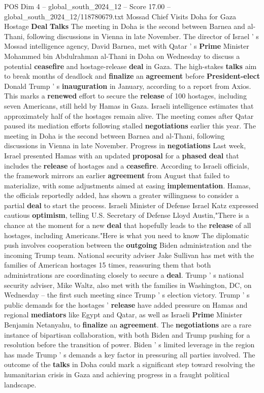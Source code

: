 \begin{textsample}{POS Dim 4 – global\_south\_2024\_12 – Score 17.00 – global\_south\_2024\_12/118780679.txt}  \label{ex:f4_pos_259}
Mossad Chief Visits Doha for Gaza Hostage \textbf{Deal} \textbf{Talks} The meeting in Doha is the second between Barnea and al-Thani, following discussions in Vienna in late November.
The director of Israel ' s Mossad intelligence agency, David Barnea, met with Qatar ' s \textbf{Prime} Minister Mohammed bin Abdulrahman al-Thani in Doha on Wednesday to discuss a potential \textbf{ceasefire} and hostage-release \textbf{deal} in Gaza.
The high-stakes \textbf{talks} aim to break months of deadlock and \textbf{finalize} an \textbf{agreement} before \textbf{President-elect} Donald Trump ' s \textbf{inauguration} in January, according to a report from Axios.
This marks a \textbf{renewed} effort to secure the \textbf{release} of 100 hostages, including seven Americans, still held by Hamas in Gaza.
Israeli intelligence estimates that approximately half of the hostages remain alive.
The meeting comes after Qatar paused its mediation efforts following stalled \textbf{negotiations} earlier this year.
The meeting in Doha is the second between Barnea and al-Thani, following discussions in Vienna in late November.
Progress in \textbf{negotiations} Last week, Israel presented Hamas with an updated \textbf{proposal} for a \textbf{phased} \textbf{deal} that includes the \textbf{release} of hostages and a \textbf{ceasefire}.
According to Israeli officials, the framework mirrors an earlier \textbf{agreement} from August that failed to materialize, with some adjustments aimed at easing \textbf{implementation}.
Hamas, the officials reportedly added, has shown a greater willingness to consider a partial \textbf{deal} to start the process.
Israeli Minister of Defense Israel Katz expressed cautious \textbf{optimism}, telling U.S.
Secretary of Defense Lloyd Austin,"There is a chance at the moment for a new \textbf{deal} that hopefully leads to the \textbf{release} of all hostages, including Americans."Here is what you need to know The diplomatic push involves cooperation between the \textbf{outgoing} Biden administration and the incoming Trump team.
National security adviser Jake Sullivan has met with the families of American hostages 15 times, reassuring them that both administrations are coordinating closely to secure a \textbf{deal}.
Trump ' s national security adviser, Mike Waltz, also met with the families in Washington, DC, on Wednesday -- the first such meeting since Trump ' s election victory.
Trump ' s public demands for the hostages ' \textbf{release} have added pressure on Hamas and regional \textbf{mediators} like Egypt and Qatar, as well as Israeli \textbf{Prime} Minister Benjamin Netanyahu, to \textbf{finalize} an \textbf{agreement}.
The \textbf{negotiations} are a rare instance of bipartisan collaboration, with both Biden and Trump pushing for a resolution before the transition of power.
Biden ' s limited leverage in the region has made Trump ' s demands a key factor in pressuring all parties involved.
The outcome of the \textbf{talks} in Doha could mark a significant step toward resolving the humanitarian crisis in Gaza and achieving progress in a fraught political landscape.


\end{textsample}
